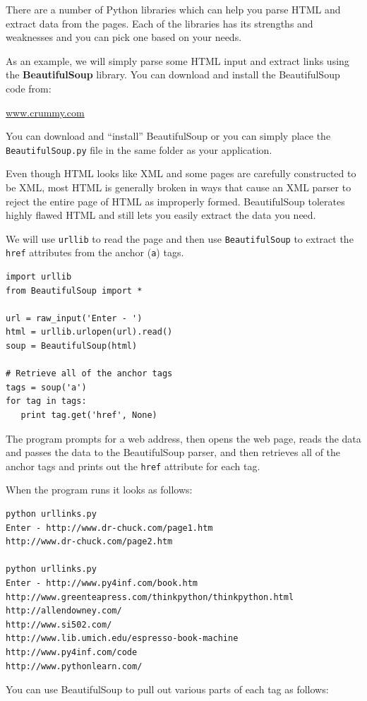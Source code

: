 \documentclass[11pt]{book}
\begin{document}
There are a number of Python libraries which can help you parse
HTML and extract data from the pages.  Each of the libraries
has its strengths and weaknesses and you can pick one based on 
your needs.

As an example, we will simply parse some HTML input 
and extract links using the {\bf BeautifulSoup} library.   
You can download and install the BeautifulSoup code
from:

\url{www.crummy.com}

You can download and ``install'' BeautifulSoup or you 
can simply place the {\tt BeautifulSoup.py} file in the
same folder as your application.

Even though HTML looks like XML and some pages are carefully 
constructed to be XML, most HTML is generally broken in ways
that cause an XML parser to reject the entire page of HTML as
improperly formed.  BeautifulSoup tolerates highly flawed 
HTML and still lets you easily extract the data you need.

We will use {\tt urllib} to read the page and then use
{\tt BeautifulSoup} to extract the {\tt href} attributes from the
anchor ({\tt a}) tags.

\beforeverb
\begin{verbatim}
import urllib
from BeautifulSoup import *

url = raw_input('Enter - ')
html = urllib.urlopen(url).read()
soup = BeautifulSoup(html)

# Retrieve all of the anchor tags
tags = soup('a')
for tag in tags:
   print tag.get('href', None)
\end{verbatim}
\afterverb
%
The program prompts for a web address, then opens the web
page, reads the data and passes the data to the BeautifulSoup
parser, and then retrieves all of the anchor tags and prints
out the {\tt href} attribute for each tag.

When the program runs it looks as follows:

\beforeverb
\begin{verbatim}
python urllinks.py 
Enter - http://www.dr-chuck.com/page1.htm
http://www.dr-chuck.com/page2.htm

python urllinks.py 
Enter - http://www.py4inf.com/book.htm
http://www.greenteapress.com/thinkpython/thinkpython.html
http://allendowney.com/
http://www.si502.com/
http://www.lib.umich.edu/espresso-book-machine
http://www.py4inf.com/code
http://www.pythonlearn.com/
\end{verbatim}
\afterverb
%
You can use BeautifulSoup to pull out various parts of each 
tag as follows:
\end{document}
